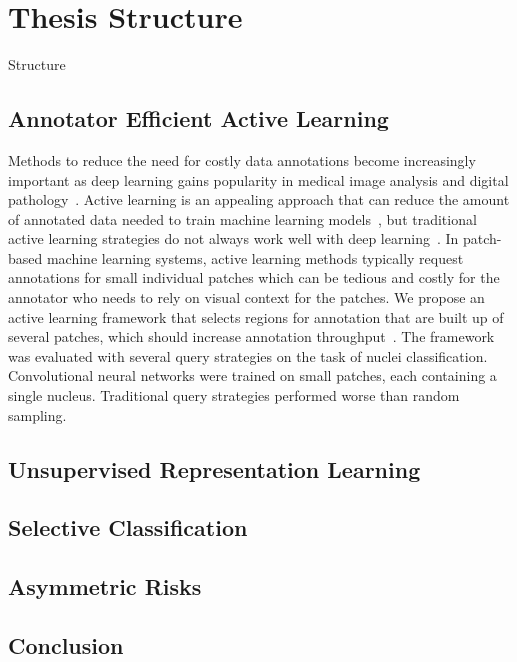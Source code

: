 \section{Thesis Structure}
\label{sec:thesis_structure}
Structure

\subsection*{Annotator Efficient Active Learning}
Methods to reduce the need for costly data annotations become increasingly important as deep learning gains popularity in medical image analysis and digital pathology~\citep{tizhoosh2018artificial}. Active learning is an appealing approach that can reduce the amount of annotated data needed to train machine learning models~\citep{settles2012active}, but traditional active learning strategies do not always work well with deep learning~\citep{wang2016cost}. In patch-based machine learning systems, active learning methods typically request annotations for small individual patches which can be tedious and costly for the annotator who needs to rely on visual context for the patches. We propose an active learning framework that selects regions for annotation that are built up of several patches, which should increase annotation throughput~\citep{carse2019active}. The framework was evaluated with several query strategies on the task of nuclei classification. Convolutional neural networks were trained on small patches, each containing a single nucleus. Traditional query strategies performed worse than random sampling.

\subsection*{Unsupervised Representation Learning}

\subsection*{Selective Classification}

\subsection*{Asymmetric Risks}

\subsection*{Conclusion}
